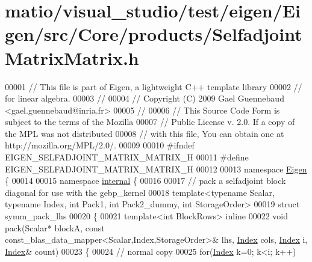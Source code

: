 \hypertarget{matio_2visual__studio_2test_2eigen_2_eigen_2src_2_core_2products_2_selfadjoint_matrix_matrix_8h_source}{}\section{matio/visual\+\_\+studio/test/eigen/\+Eigen/src/\+Core/products/\+Selfadjoint\+Matrix\+Matrix.h}
\label{matio_2visual__studio_2test_2eigen_2_eigen_2src_2_core_2products_2_selfadjoint_matrix_matrix_8h_source}

\begin{DoxyCode}
00001 \textcolor{comment}{// This file is part of Eigen, a lightweight C++ template library}
00002 \textcolor{comment}{// for linear algebra.}
00003 \textcolor{comment}{//}
00004 \textcolor{comment}{// Copyright (C) 2009 Gael Guennebaud <gael.guennebaud@inria.fr>}
00005 \textcolor{comment}{//}
00006 \textcolor{comment}{// This Source Code Form is subject to the terms of the Mozilla}
00007 \textcolor{comment}{// Public License v. 2.0. If a copy of the MPL was not distributed}
00008 \textcolor{comment}{// with this file, You can obtain one at http://mozilla.org/MPL/2.0/.}
00009 
00010 \textcolor{preprocessor}{#ifndef EIGEN\_SELFADJOINT\_MATRIX\_MATRIX\_H}
00011 \textcolor{preprocessor}{#define EIGEN\_SELFADJOINT\_MATRIX\_MATRIX\_H}
00012 
00013 \textcolor{keyword}{namespace }\hyperlink{namespace_eigen}{Eigen} \{ 
00014 
00015 \textcolor{keyword}{namespace }\hyperlink{namespaceinternal}{internal} \{
00016 
00017 \textcolor{comment}{// pack a selfadjoint block diagonal for use with the gebp\_kernel}
00018 \textcolor{keyword}{template}<\textcolor{keyword}{typename} Scalar, \textcolor{keyword}{typename} Index, \textcolor{keywordtype}{int} Pack1, \textcolor{keywordtype}{int} Pack2\_dummy, \textcolor{keywordtype}{int} StorageOrder>
00019 \textcolor{keyword}{struct }symm\_pack\_lhs
00020 \{
00021   \textcolor{keyword}{template}<\textcolor{keywordtype}{int} BlockRows> \textcolor{keyword}{inline}
00022   \textcolor{keywordtype}{void} pack(Scalar* blockA, \textcolor{keyword}{const} const\_blas\_data\_mapper<Scalar,Index,StorageOrder>& lhs, 
      \hyperlink{namespace_eigen_a62e77e0933482dafde8fe197d9a2cfde}{Index} cols, \hyperlink{namespace_eigen_a62e77e0933482dafde8fe197d9a2cfde}{Index} i, \hyperlink{namespace_eigen_a62e77e0933482dafde8fe197d9a2cfde}{Index}& count)
00023   \{
00024     \textcolor{comment}{// normal copy}
00025     \textcolor{keywordflow}{for}(\hyperlink{namespace_eigen_a62e77e0933482dafde8fe197d9a2cfde}{Index} k=0; k<i; k++)

\end{DoxyCode}
